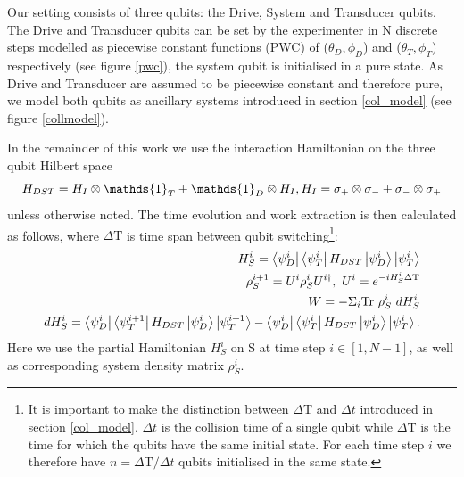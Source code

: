 Our setting consists of three qubits: the Drive, System and Transducer qubits. The Drive and Transducer qubits can be set by the experimenter in N discrete steps modelled as piecewise constant functions (PWC) of ($\theta_D, \phi_D$) and ($\theta_T, \phi_T$) respectively (see figure \ref{pwc}), the system qubit is initialised in a pure state.
As Drive and Transducer are assumed to be piecewise constant and therefore pure, we model both qubits as ancillary systems introduced in section \ref{col_model} (see figure \ref{collmodel}).

In the remainder of this work we use the interaction Hamiltonian on the three qubit Hilbert space
\begin{equation*}
	H_{DST} = H_{I} \otimes \mathds{1}_T + \mathds{1}_D \otimes H_{I}, \\
	H_{I} = \sigma_{+} \otimes \sigma_{-} + \sigma_{-} \otimes \sigma_{+}
\end{equation*}
unless otherwise noted.
The time evolution and work extraction is then calculated as follows, where $\Delta \mathrm{T}$ is time span between qubit switching\footnote{It is important to make the distinction between $\Delta \mathrm{T}$ and $\Delta t$ introduced in section \ref{col_model}. $\Delta t$ is the collision time of a single qubit while $\Delta \mathrm{T}$ is the time for which the qubits have the same initial state. For each time step $i$ we therefore have $n = \Delta \mathrm{T} / \Delta t$ qubits initialised in the same state.}:
\begin{align}
	H_S^i = \bra{\psi_D^i}\bra{\psi_T^i} H_{DST} \ket{\psi_D^i} \ket{\psi_T^i} \\
	\rho_S^{i+1} = U^i \rho_S^i U^{i\dagger}, \ U^i = e^{-iH_S^i \Delta \mathrm{T}} \\
	W = - \Sigma_i \mathrm{Tr} \ \rho_S^i \ dH_S^i \\
	dH_S^i = \bra{\psi_D^i}\bra{\psi_T^{i+1}} H_{DST} \ket{\psi_D^i} \ket{\psi_T^{i+1}} - \bra{\psi_D^i}\bra{\psi_T^i} H_{DST} \ket{\psi_D^i} \ket{\psi_T^i}.	
\end{align}
Here we use the partial Hamiltonian $H_S^i$ on S at time step $i \in [1, N - 1]$, as well as corresponding system density matrix $\rho_S^i$.


